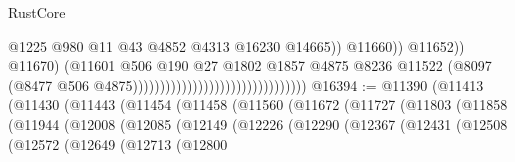 \begin{lexlean}{RustCore}
\begin{coremodule}
                                                                            @1225
                                                                            @980
                                                                            @11
                                                                            @43
                                                                            @4852
                                                                            @4313
                                                                            @16230
                                                                            @14665))
                                                                        @11660))
                                                                    @11652))
                                                                @11670)
                                                              (@11601
                                                                @506
                                                                @190
                                                                @27
                                                                @1802
                                                                @1857
                                                                @4875
                                                                @8236
                                                                @11522
                                                                (@8097
                                                                  (@8477
                                                                    @506
                                                                    @4875))))))))))))))))))))))))))))))))
@16394 := @11390
    (@11413
      (@11430
        (@11443
          (@11454
            (@11458
              (@11560
                (@11672
                  (@11727
                    (@11803
                      (@11858
                        (@11944
                          (@12008
                            (@12085
                              (@12149
                                (@12226
                                  (@12290
                                    (@12367
                                      (@12431
                                        (@12508
                                          (@12572
                                            (@12649
                                              (@12713
                                                (@12800

\end{coremodule}
\end{lexlean}
